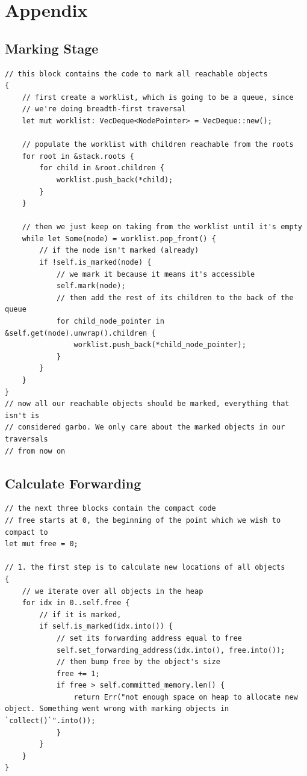 \documentclass[index]{subfiles}
\begin{document}
\newpage

\raggedright{}
\printbibliography[heading=bibintoc]

\section{Appendix}
\appendix
\renewcommand{\thesubsection}{\Alph{subsection}}

\subsection{Marking Stage}
\begin{verbatim}
// this block contains the code to mark all reachable objects
{
    // first create a worklist, which is going to be a queue, since
    // we're doing breadth-first traversal
    let mut worklist: VecDeque<NodePointer> = VecDeque::new();

    // populate the worklist with children reachable from the roots
    for root in &stack.roots {
        for child in &root.children {
            worklist.push_back(*child);
        }
    }

    // then we just keep on taking from the worklist until it's empty
    while let Some(node) = worklist.pop_front() {
        // if the node isn't marked (already)
        if !self.is_marked(node) {
            // we mark it because it means it's accessible
            self.mark(node);
            // then add the rest of its children to the back of the queue
            for child_node_pointer in &self.get(node).unwrap().children {
                worklist.push_back(*child_node_pointer);
            }
        }
    }
}
// now all our reachable objects should be marked, everything that isn't is
// considered garbo. We only care about the marked objects in our traversals
// from now on
\end{verbatim}
\subsection{Calculate Forwarding}
\begin{verbatim}
// the next three blocks contain the compact code
// free starts at 0, the beginning of the point which we wish to compact to
let mut free = 0;

// 1. the first step is to calculate new locations of all objects
{
    // we iterate over all objects in the heap
    for idx in 0..self.free {
        // if it is marked,
        if self.is_marked(idx.into()) {
            // set its forwarding address equal to free
            self.set_forwarding_address(idx.into(), free.into());
            // then bump free by the object's size
            free += 1;
            if free > self.committed_memory.len() {
                return Err("not enough space on heap to allocate new object. Something went wrong with marking objects in `collect()`".into());
            }
        }
    }
}
\end{verbatim}
\end{document}
